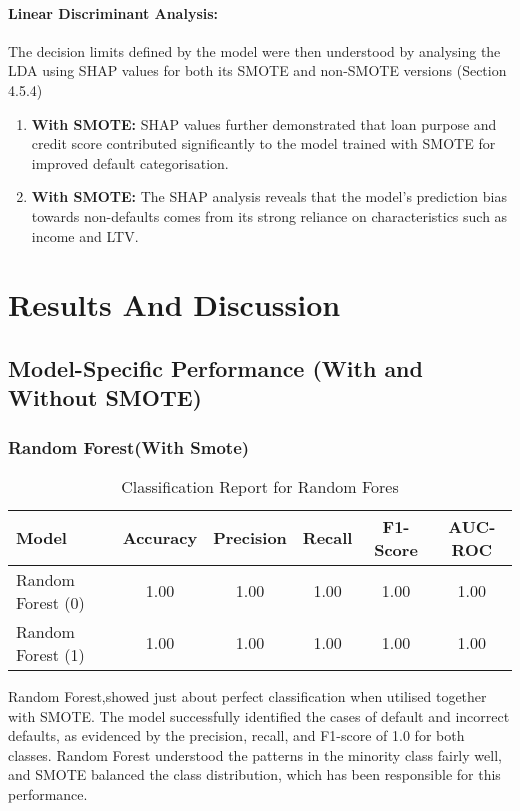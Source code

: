\documentclass[12pt, a4paper,oneside]{book}
\numberwithin{equation}{section}
\begin{document}
\subsubsection{ Linear Discriminant Analysis:}
The decision limits defined by the model were then understood by analysing the LDA using SHAP values for both its SMOTE and non-SMOTE versions (Section 4.5.4)

\begin{enumerate}
    \item\textbf{With SMOTE:} \newline
    SHAP values further demonstrated that loan purpose and credit score contributed significantly to the model trained with SMOTE for improved default categorisation.
    
    \item\textbf{With SMOTE:} \newline
    The SHAP analysis reveals that the model's prediction bias towards non-defaults comes from its strong reliance on characteristics such as income and LTV.
\end{enumerate}

\newpage
\chapter{Results And Discussion}
\section{Model-Specific Performance (With and Without SMOTE)}

\subsection{Random Forest(With Smote)}

\begin{table}[h!]
\centering
\begin{tabular}{|l|c|c|c|c|c|}
\hline
\textbf{Model} & \textbf{Accuracy} & \textbf{Precision} & \textbf{Recall} & \textbf{F1-Score} & \textbf{AUC-ROC} \\ \hline
Random Forest (0) &  1.00 & 1.00 & 1.00 & 1.00 & 1.00 \\ \hline
Random Forest (1)& 1.00 & 1.00 & 1.00 & 1.00 & 1.00 \\ \hline
\end{tabular}
\label{tab:performance_metrics}
\caption{Classification Report for Random Fores}
\end{table}
Random Forest,showed just about perfect classification when utilised together with SMOTE. The model successfully identified the cases of default and incorrect defaults, as evidenced by the precision, recall, and F1-score of 1.0 for both classes. Random Forest understood the patterns in the minority class fairly well, and SMOTE balanced the class distribution, which has been responsible for this performance.
\end{document}
